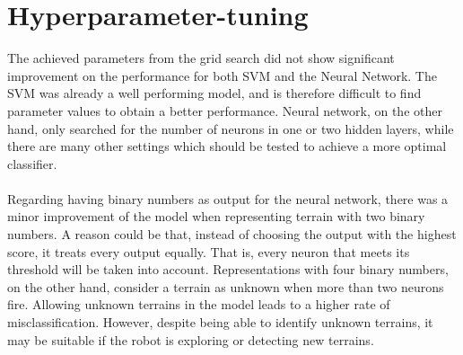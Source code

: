 \documentclass[USenglish]{ifimaster}  %
\begin{document}
\section{Hyperparameter-tuning}
The achieved parameters from the grid search did not show significant improvement on the performance for both SVM and the Neural Network. The SVM was already a well performing model, and is therefore difficult to find parameter values to obtain a better performance. Neural network, on the other hand, only searched for the number of neurons in one or two hidden layers, while there are many other settings which should be tested to achieve a more optimal classifier. 
\\
\\
Regarding having binary numbers as output for the neural network, there was a minor improvement of the model when representing terrain with two binary numbers. A reason could be that, instead of choosing the output with the highest score, it treats every output equally. That is, every neuron that meets its threshold will be taken into account. Representations with four binary numbers, on the other hand, consider a terrain as unknown when more than two neurons fire. Allowing unknown terrains in the model leads to a higher rate of misclassification. However, despite being able to identify unknown terrains, it may be suitable if the robot is exploring or detecting new terrains.
\end{document}
